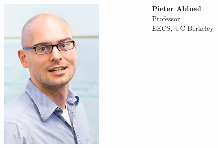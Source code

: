 \documentclass[compress]{beamer}
\begin{document}
\begin{frame}
\begin{columns}
        \begin{column}{.3\textwidth}
            \includegraphics[width=\textwidth,height=.5\textheight]{auth2}
        \end{column}
        \begin{column}{.2\textwidth}
            \tiny
            \textbf{Pieter Abbeel} \\
            Professor \\
            EECS, UC Berkeley \\
        \end{column}
    \end{columns}
    \vfill
    \begin{columns}
        \begin{column}{.3\textwidth}

\end{column}
\end{columns}
\end{frame}
\end{document}
